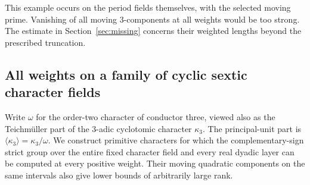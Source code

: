 \documentclass[a4paper,11pt]{article}
\theoremstyle{definition}
\theoremstyle{remark}
\numberwithin{equation}{section}
\begin{document}
This example occurs on the period fields themselves, with the
selected moving prime. Vanishing of all moving \(3\)-components
at all weights would be too strong. The estimate in
Section~\ref{sec:missing} concerns their weighted lengths
beyond the prescribed truncation.


\subsection{All weights on a family of cyclic sextic character fields}
\label{sec:sexticstrict669}

Write \(\omega\) for the order-two character of conductor three,
viewed also as the Teichm\"uller part of the \(3\)-adic cyclotomic
character \(\kappa_3\). The principal-unit part is
\(\langle\kappa_3\rangle=\kappa_3/\omega\). We construct primitive
characters for which the complementary-sign strict group over
the entire fixed character field and every real dyadic layer
can be computed at every positive weight. Their moving quadratic
components on the same intervals also give lower bounds of
arbitrarily large rank.
\end{document}
